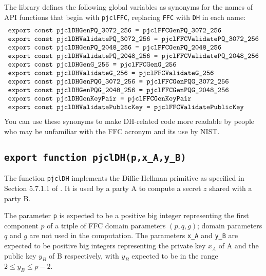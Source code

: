 \documentclass[12pt]{article}
\begin{document}
The library defines the following global variables as 
synonyms for the names of API functions that begin with {\tt pjclFFC},
replacing {\tt FFC} with {\tt DH} in each name:
$$
\begin{array}{l}
\mbox{\tt export const pjclDHGenPQ\_3072\_256 = pjclFFCGenPQ\_3072\_256}\\
\mbox{\tt export const pjclDHValidatePQ\_3072\_256 = pjclFFCValidatePQ\_3072\_256}\\
\mbox{\tt export const pjclDHGenPQ\_2048\_256 = pjclFFCGenPQ\_2048\_256}\\
\mbox{\tt export const pjclDHValidatePQ\_2048\_256 = pjclFFCValidatePQ\_2048\_256}\\
\mbox{\tt export const pjclDHGenG\_256 = pjclFFCGenG\_256}\\
\mbox{\tt export const pjclDHValidateG\_256 = pjclFFCValidateG\_256}\\
\mbox{\tt export const pjclDHGenPQG\_3072\_256 = pjclFFCGenPQG\_3072\_256}\\
\mbox{\tt export const pjclDHGenPQG\_2048\_256 = pjclFFCGenPQG\_2048\_256}\\
\mbox{\tt export const pjclDHGenKeyPair = pjclFFCGenKeyPair}\\
\mbox{\tt export const pjclDHValidatePublicKey = pjclFFCValidatePublicKey}
\end{array}
$$
You can use these synonyms to make DH-related code more readable by people 
who may be unfamiliar with the FFC acronym and its use
by NIST.

\subsection{\tt export function pjclDH(p,x\_A,y\_B)}

The function {\tt pjclDH} implements the Diffie-Hellman primitive
as specified in Section 5.7.1.1 of \cite{NIST-DH}.  It is used by a party A
to compute a secret $z$ shared with a party B.

The parameter {\tt p} is expected to be a positive big integer representing the first component $p$
of a triple of FFC domain parameters $(p,q,g)$; domain parameters $q$ and $g$ are not 
used in the computation.  The parameters {\tt x\_A} and {\tt y\_B} are expected to be 
positive big integers
representing the private key $x_A$ of A and the public key $y_B$ of B respectively,
with $y_B$ expected to be in the range $2 \leq y_B \leq p-2$.
\end{document}
